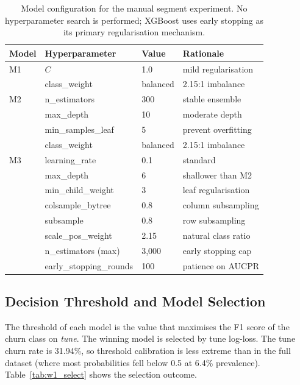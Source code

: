 \documentclass{article}
\begin{document}
\begin{table}[H]
\centering
\small
\renewcommand{\arraystretch}{1.15}
\begin{tabular}{llll}
\toprule
\textbf{Model} & \textbf{Hyperparameter} & \textbf{Value} & \textbf{Rationale} \\
\midrule
M1 & $C$ & 1.0 & mild regularisation \\
   & class\_weight & balanced & 2.15:1 imbalance \\
\midrule
M2 & n\_estimators & 300 & stable ensemble \\
   & max\_depth & 10 & moderate depth \\
   & min\_samples\_leaf & 5 & prevent overfitting \\
   & class\_weight & balanced & 2.15:1 imbalance \\
\midrule
M3 & learning\_rate & 0.1 & standard \\
   & max\_depth & 6 & shallower than M2 \\
   & min\_child\_weight & 3 & leaf regularisation \\
   & colsample\_bytree & 0.8 & column subsampling \\
   & subsample & 0.8 & row subsampling \\
   & scale\_pos\_weight & 2.15 & natural class ratio \\
   & n\_estimators (max) & 3{,}000 & early stopping cap \\
   & early\_stopping\_rounds & 100 & patience on AUCPR \\
\bottomrule
\end{tabular}
\caption{Model configuration for the manual segment experiment. No hyperparameter search is performed; XGBoost uses early stopping as its primary regularisation mechanism.}
\label{tab:w1_config}
\end{table}

\subsection{Decision Threshold and Model Selection}

The threshold of each model is the value that maximises the F1 score of the churn class on \emph{tune}. The winning model is selected by tune log-loss. The tune churn rate is 31.94\%, so threshold calibration is less extreme than in the full dataset (where most probabilities fell below 0.5 at 6.4\% prevalence). Table~\ref{tab:w1_select} shows the selection outcome.
\end{document}
